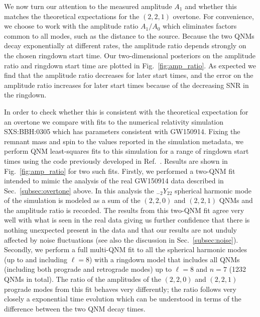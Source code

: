 We now turn our attention to the measured amplitude $A_1$ and whether this matches the theoretical expectations for the $(2,2,1)$ overtone. 
For convenience, we choose to work with the amplitude ratio $A_1/A_0$ which eliminates factors common to all modes, such as the distance to the source. 
Because the two QNMs decay exponentially at different rates, the amplitude ratio depends strongly on the chosen ringdown start time.
Our two-dimensional posteriors on the amplitude ratio and ringdown start time are plotted in Fig.~\ref{fig:amp_ratio}.
As expected we find that the amplitude ratio decreases for later start times, and the error on the amplitude ratio increases for later start times because of the decreasing SNR in the ringdown.

In order to check whether this is consistent with the theoretical expectation for an overtone we compare with fits to the numerical relativity simulation SXS:BBH:0305 \cite{Lovelace:2016uwp, sxs_catalog} which has parameters consistent with GW150914.
Fixing the remnant mass and spin to the values reported in the simulation metadata, we perform QNM least-squares fits to this simulation for a range of ringdown start times using the code previously developed in Ref.~\cite{Finch:2021iip}.
Results are shown in Fig.~\ref{fig:amp_ratio} for two such fits. 
Firstly, we performed a two-QNM fit intended to mimic the analysis of the real GW150914 data described in Sec.~\ref{subsec:overtone} above. 
In this analysis the ${}_{-2}Y_{22}$ spherical harmonic mode of the simulation is modeled as a sum of the $(2,2,0)$ and $(2,2,1)$ QNMs and the amplitude ratio is recorded. 
The results from this two-QNM fit agree very well with what is seen in the real data giving us further confidence that there is nothing unexpected present in the data and that our results are not unduly affected by noise fluctuations (see also the discussion in Sec.~\ref{subsec:noise}). 
Secondly, we perform a full multi-QNM fit to all the spherical harmonic modes (up to and including $\ell = 8$) with a ringdown model that includes all QNMs (including both prograde and retrograde modes) up to $\ell = 8$ and $n = 7$ (1232 QNMs in total).
The ratio of the amplitudes of the $(2,2,0)$ and $(2,2,1)$ prograde modes from this fit behaves very differently; the ratio follows very closely a exponential time evolution which can be understood in terms of the difference between the two QNM decay times.

